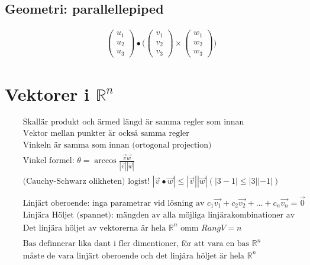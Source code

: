 \subsection{Geometri: parallellepiped}
\begin{align*}
  &\quad  \begin{pmatrix} u_1 \\ u_2 \\ u_3 \end{pmatrix} \bullet
  \Bigg( \begin{pmatrix} v_1 \\ v_2 \\ v_3 \end{pmatrix} \times \begin{pmatrix} w_1 \\ w_2 \\ w_3 \end{pmatrix} \Bigg)
\end{align*}


\newpage

\section{Vektorer i $\mathbb{R}^n$}
\begin{align*}
  &\quad  \text{Skallär produkt och ärmed längd är samma regler som innan} \\
  &\quad  \text{Vektor mellan punkter är också samma regler} \\
  &\quad  \text{Vinkeln är samma som innan (ortogonal projection)} \\
  &\quad  \text{Vinkel formel: } \theta=\arccos{\frac{\vec{v}\vec{w}}{|\vec{v}||\vec{w}|}} \\
  &\quad  \text{(Cauchy-Schwarz olikheten) logist! } |\vec{v}\bullet\vec{w}|\leq|\vec{v}||\vec{w}|
  (|3-1|\leq|3||-1|)\\
  &\quad  \\
  &\quad  \text{Linjärt oberoende: inga parametrar vid lösning av }
  c_1\vec{v_1}+c_2\vec{v_2}+\ldots{}+c_n\vec{v_n}=\vec{0} \\
  &\quad  \text{Linjära Höljet (spannet): mängden av alla möjliga linjärakombinationer av vektorerna} \\
  &\quad  \text{Det linjära höljet av vektorerna är hela $\mathbb{R}^n$ omm $Rang{V}=n$} \\
  &\quad  \\
  &\quad  \text{Bas definnerar lika dant i fler dimentioner, för att vara en bas $\mathbb{R}^n$} \\
  &\quad  \text{måste de vara linjärt oberoende och det linjära höljet är hela $\mathbb{R}^n$} \\
\end{align*}



